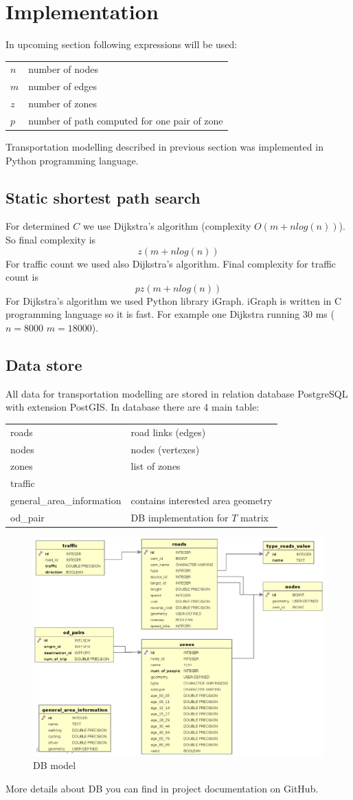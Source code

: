 \section{Implementation}
In upcoming section following expressions will be used:

\begin{tabular}{ll}
$n$ & number of nodes\\
$m$ & number of edges \\
$z$ & number of zones\\
$p$ & number of path computed for one pair of zone
\end{tabular}

Transportation modelling described in previous section was implemented in Python programming language.

\subsection{Static shortest path search}
For determined $C$ we use Dijkstra's algorithm (complexity $O(m +n log(n))$). So final complexity is 
$$z (m + n log(n))$$
For traffic count we used also Dijkstra's algorithm. Final complexity for traffic count is 
$$p z (m + n log(n))$$
For Dijkstra's algorithm we used Python library iGraph. iGraph is written in C programming language so it is fast. For example one Dijkstra running 30 ms ($n = 8000$ $m = 18000$).

\subsection{Data store}
All data for transportation modelling are stored in relation database PostgreSQL with extension PostGIS. In database there are 4 main table:

\begin{tabular}{ll}
roads & road links (edges)\\
nodes & nodes (vertexes)\\
zones & list of zones\\ 
traffic & \\
general\_area\_information & contains interested area geometry\\
od\_pair & DB implementation for $T$ matrix\\
\end{tabular}

\begin{figure}
\centering
\includegraphics[width=15cm]{img/db.eps}
\caption{DB model}
\end{figure}

More details about DB you can find in project documentation on GitHub.
